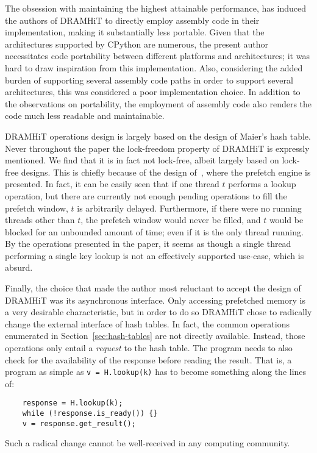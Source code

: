 The obsession with maintaining the highest attainable performance, has induced the authors of DRAMHiT to directly employ assembly code in their implementation, making it substantially less portable.
Given that the architectures supported by CPython are numerous, the present author necessitates code portability between different platforms and architectures; it was hard to draw inspiration from this implementation.
Also, considering the added burden of supporting several assembly code paths in order to support several architectures, this was considered a poor implementation choice.
In addition to the observations on portability, the employment of assembly code also renders the code much less readable and maintainable.

DRAMHiT operations design is largely based on the design of Maier's hash table.
Never throughout the paper the lock-freedom property of DRAMHiT is expressly mentioned.
We find that it is in fact not lock-free, albeit largely based on lock-free designs.
This is chiefly because of the design of~\cite[Algorithm~1]{dramhit}, where the prefetch engine is presented.
In fact, it can be easily seen that if one thread $t$ performs a lookup operation, but there are currently not enough pending operations to fill the prefetch window, $t$ is arbitrarily delayed.
Furthermore, if there were no running threads other than $t$, the prefetch window would never be filled, and $t$ would be blocked for an unbounded amount of time; even if it is the only thread running.
By the operations presented in the paper, it seems as though a single thread performing a single key lookup is not an effectively supported use-case, which is absurd.

Finally, the choice that made the author most reluctant to accept the design of DRAMHiT was its asynchronous interface.
Only accessing prefetched memory is a very desirable characteristic, but in order to do so DRAMHiT chose to radically change the external interface of hash tables.
In fact, the common operations enumerated in Section~\ref{sec:hash-tables} are not directly available.
Instead, those operations only entail a \emph{request} to the hash table.
The program needs to also check for the availability of the response before reading the result.
That is, a program as simple as \texttt{{v = H.lookup(k)}} has to become something along the lines of:
\begin{verbatim}
	response = H.lookup(k);
	while (!response.is_ready()) {}
	v = response.get_result();
\end{verbatim}
Such a radical change cannot be well-received in any computing community.

